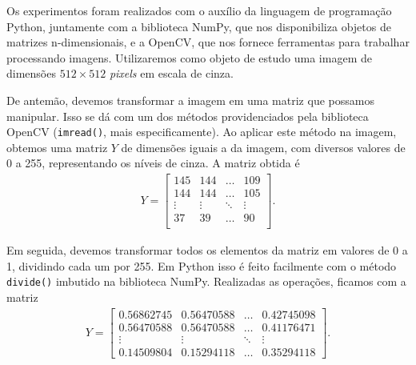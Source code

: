 \documentclass[a4paper,12pt]{article}
\begin{document}



Os experimentos foram realizados com o auxílio da linguagem de programação Python, juntamente com a biblioteca NumPy, que nos disponibiliza objetos de matrizes n-dimensionais, e a OpenCV, que nos fornece ferramentas para trabalhar processando imagens. Utilizaremos como objeto de estudo uma imagem de dimensões $512 \times 512$ \textit{pixels} em escala de cinza.

De antemão, devemos transformar a imagem em uma matriz que possamos manipular. Isso se dá com um dos métodos providenciados pela biblioteca OpenCV (\texttt{imread()}, mais especificamente). Ao aplicar este método na imagem, obtemos uma matriz $Y$ de dimensões iguais a da imagem, com diversos valores de 0 a 255, representando os níveis de cinza. A matriz obtida é
\begin{align*}
Y = 
\begin{bmatrix}
145 & 144 & \dots & 109\\
144 & 144 & \dots & 105\\
\vdots & \vdots & \ddots & \vdots\\
37 & 39 & \dots & 90\\
\end{bmatrix}.
\end{align*}

Em seguida, devemos transformar todos os elementos da matriz em valores de 0 a 1, dividindo cada um por 255. Em Python isso é feito facilmente com o método \texttt{divide()} imbutido na biblioteca NumPy. Realizadas as operações, ficamos com a matriz 
\begin{align*}
Y = 
\begin{bmatrix}
0.56862745 & 0.56470588 & \dots & 0.42745098\\
0.56470588 & 0.56470588 & \dots & 0.41176471\\
\vdots & \vdots & \ddots & \vdots\\
0.14509804 & 0.15294118 & \dots & 0.35294118
\end{bmatrix}.
\end{align*}
\end{document}
